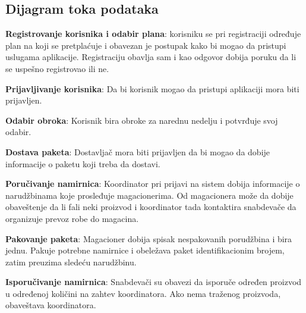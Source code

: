 \subsection{Dijagram toka podataka}
	\textbf{Registrovanje korisnika i odabir plana}: korisniku se pri registraciji određuje plan na koji se pretplaćuje i obavezan je postupak kako bi mogao da pristupi uslugama aplikacije. Registraciju obavlja sam i kao odgovor dobija poruku da li se uspešno registrovao ili ne.
	
	\textbf{Prijavljivanje korisnika}: Da bi korisnik mogao da pristupi aplikaciji mora biti prijavljen.
		
	\textbf{Odabir obroka}: Korisnik bira obroke za narednu nedelju i potvrđuje svoj odabir.
	
	
	\textbf{Dostava paketa}: Dostavljač mora biti prijavljen da bi mogao da dobije informacije o paketu koji treba da dostavi. 
	
	
	\textbf{Poručivanje namirnica}: Koordinator pri prijavi na sistem dobija informacije o narudžbinama koje prosleđuje magacionerima. Od magacionera može da dobije obaveštenje da li fali neki proizvod i koordinator tada kontaktira snabdevače da organizuje prevoz robe do magacina. 
	
	\textbf{Pakovanje paketa}: Magacioner dobija spisak nespakovanih porudžbina i bira jednu. Pakuje potrebne namirnice i obeležava paket identifikacionim brojem, zatim preuzima sledeću narudžbinu.
	
	\textbf{Isporučivanje namirnica}: Snabdevači su obavezi da isporuče određen proizvod u određenoj količini na zahtev koordinatora. Ako nema traženog proizvoda, obaveštava koordinatora.
	